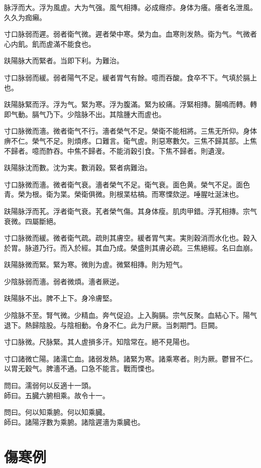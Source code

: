 脉浮而大。浮为風虗。大为气强。風气相摶。必成癮疹。身体为癢。癢者名泄風。久久为痂癩。

寸口脉弱而遲。弱者衛气微。遲者榮中寒。榮为血。血寒則发熱。衛为气。气微者心内飢。飢而虗滿不能食也。

趺陽脉大而緊者。当即下利。为難治。

寸口脉弱而緩。弱者陽气不足。緩者胃气有餘。噫而吞酸。食卒不下。气填於膈上也。

趺陽脉緊而浮。浮为气。緊为寒。浮为腹滿。緊为絞痛。浮緊相摶。腸鳴而轉。轉即气動。膈气乃下。少陰脉不出。其陰腫大而虗也。

寸口脉微而濇。微者衛气不行。濇者榮气不足。榮衛不能相將。三焦无所仰。身体痹不仁。榮气不足。則煩疼。口難言。衛气虗。則惡寒數欠。三焦不歸其部。上焦不歸者。噫而酢吞。中焦不歸者。不能消穀引食。下焦不歸者。則遺溲。

趺陽脉沈而數。沈为実。數消穀。緊者病難治。

寸口脉微而濇。微者衛气衰。濇者榮气不足。衛气衰。面色黄。榮气不足。面色青。榮为根。衛为枼。榮衛俱微。則根枼枯槁。而寒慄欬逆。唾腥吐涎沫也。

趺陽脉浮而芤。浮者衛气衰。芤者榮气傷。其身体瘦。肌肉甲錯。浮芤相摶。宗气衰微。四屬斷絕。

寸口脉微而緩。微者衛气疏。疏則其膚空。緩者胃气実。実則穀消而水化也。穀入於胃。脉道乃行。而入於經。其血乃成。榮盛則其膚必疏。三焦絕經。名曰血崩。

趺陽脉微而緊。緊为寒。微則为虗。微緊相摶。則为短气。

少陰脉弱而濇。弱者微煩。濇者厥逆。

趺陽脉不出。脾不上下。身冷膚堅。

少陰脉不至。腎气微。少精血。奔气促迫。上入胸膈。宗气反聚。血結心下。陽气退下。熱歸陰股。与陰相動。令身不仁。此为尸厥。当刺期門。巨闕。

寸口脉微。尺脉緊。其人虗損多汗。知陰常在。絕不見陽也。

寸口諸微亡陽。諸濡亡血。諸弱发熱。諸緊为寒。諸乘寒者。則为厥。鬱冒不仁。以胃无穀气。脾濇不通。口急不能言。戰而慄也。

問曰。濡弱何以反適十一頭。\\
師曰。五臓六腑相乘。故令十一。

問曰。何以知乘腑。何以知乘臓。\\
師曰。諸陽浮數为乘腑。諸陰遲濇为乘臓也。

\chapter{傷寒例}

